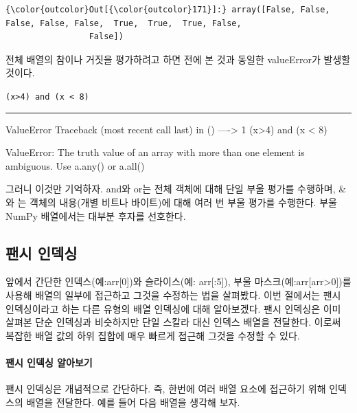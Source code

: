 \documentclass[11pt]{article}
\begin{document}
\begin{Verbatim}[commandchars=\\\{\}]
{\color{outcolor}Out[{\color{outcolor}171}]:} array([False, False, False, False, False,  True,  True,  True, False,
                 False])
\end{Verbatim}
            
    전체 배열의 참이나 거짓을 평가하려고 하면 전에 본 것과 동일한
valueError가 발생할 것이다.

    \texttt{(x\textgreater{}4)\ and\ (x\ \textless{}\ 8)}

\begin{center}\rule{0.5\linewidth}{\linethickness}\end{center}

ValueError Traceback (most recent call last) in () ----\textgreater{} 1
(x\textgreater{}4) and (x \textless{} 8)

ValueError: The truth value of an array with more than one element is
ambiguous. Use a.any() or a.all()

    그러니 이것만 기억하자. and와 or는 전체 객체에 대해 단일 부울 평가를
수행하며, \&와 \textbar{}는 객체의 내용(개별 비트나 바이트)에 대해 여러
번 부울 평가를 수행한다. 부울 NumPy 배열에서는 대부분 후자를 선호한다.

    \hypertarget{uxd32cuxc2dc-uxc778uxb371uxc2f1}{%
\subsection{팬시 인덱싱}\label{uxd32cuxc2dc-uxc778uxb371uxc2f1}}

앞에서 간단한 인덱스(예:arr{[}0{]})와 슬라이스(예: arr{[}:5{]}), 부울
마스크(예:arr{[}arr\textgreater{}0{]})를 사용해 배열의 일부에 접근하고
그것을 수정하는 법을 살펴봤다. 이번 절에서는 팬시 인덱싱이라고 하는 다른
유형의 배열 인덱싱에 대해 알아보겠다. 팬시 인덱싱은 이미 살펴본 단순
인덱싱과 비슷하지만 단일 스칼라 대신 인덱스 배열을 전달한다. 이로써
복잡한 배열 값의 하위 집합에 매우 빠르게 접근해 그것을 수정할 수 있다.

    \hypertarget{uxd32cuxc2dc-uxc778uxb371uxc2f1-uxc54cuxc544uxbcf4uxae30}{%
\paragraph{팬시 인덱싱
알아보기}\label{uxd32cuxc2dc-uxc778uxb371uxc2f1-uxc54cuxc544uxbcf4uxae30}}

팬시 인덱싱은 개념적으로 간단하다. 즉, 한번에 여러 배열 요소에 접근하기
위해 인덱스의 배열을 전달한다. 예를 들어 다음 배열을 생각해 보자.
\end{document}
